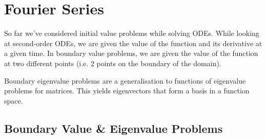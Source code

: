 \section{Fourier Series}

So far we've considered initial value problems while solving ODEs. While looking at second-order ODEs, we are given the value of the function and its derivative at a given time. In boundary value problems, we are given the value of the function at two different points (i.e. 2 points on the boundary of the domain).

Boundary eigenvalue problems are a generalisation to functions of eigenvalue problems for matrices. This yields eigenvectors that form a basis in a function space. 

\subsection{Boundary Value \& Eigenvalue Problems}\label{sec:boundaryvalprob}

